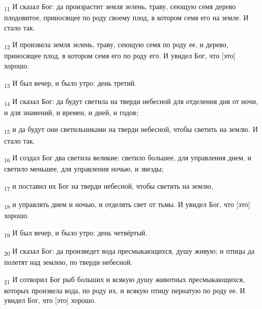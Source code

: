 \begin{tcolorbox}
\textsubscript{11} И сказал Бог: да произрастит земля зелень, траву, сеющую семя дерево плодовитое, приносящее по роду своему плод, в котором семя его на земле. И стало так.
\end{tcolorbox}
\begin{tcolorbox}
\textsubscript{12} И произвела земля зелень, траву, сеющую семя по роду ее, и дерево, приносящее плод, в котором семя его по роду его. И увидел Бог, что [это] хорошо.
\end{tcolorbox}
\begin{tcolorbox}
\textsubscript{13} И был вечер, и было утро: день третий.
\end{tcolorbox}
\begin{tcolorbox}
\textsubscript{14} И сказал Бог: да будут светила на тверди небесной для отделения дня от ночи, и для знамений, и времен, и дней, и годов;
\end{tcolorbox}
\begin{tcolorbox}
\textsubscript{15} и да будут они светильниками на тверди небесной, чтобы светить на землю. И стало так.
\end{tcolorbox}
\begin{tcolorbox}
\textsubscript{16} И создал Бог два светила великие: светило большее, для управления днем, и светило меньшее, для управления ночью, и звезды;
\end{tcolorbox}
\begin{tcolorbox}
\textsubscript{17} и поставил их Бог на тверди небесной, чтобы светить на землю,
\end{tcolorbox}
\begin{tcolorbox}
\textsubscript{18} и управлять днем и ночью, и отделять свет от тьмы. И увидел Бог, что [это] хорошо.
\end{tcolorbox}
\begin{tcolorbox}
\textsubscript{19} И был вечер, и было утро: день четвёртый.
\end{tcolorbox}
\begin{tcolorbox}
\textsubscript{20} И сказал Бог: да произведет вода пресмыкающихся, душу живую; и птицы да полетят над землею, по тверди небесной.
\end{tcolorbox}
\begin{tcolorbox}
\textsubscript{21} И сотворил Бог рыб больших и всякую душу животных пресмыкающихся, которых произвела вода, по роду их, и всякую птицу пернатую по роду ее. И увидел Бог, что [это] хорошо.
\end{tcolorbox}
